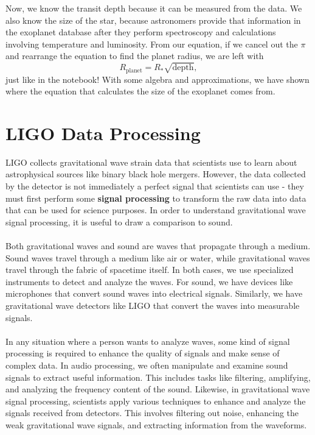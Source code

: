 \documentclass[14pt]{article}
\begin{document}
\noindent Now, we know the transit depth because it can be measured from the data. We also know the size of the star, because astronomers provide that information in the exoplanet database after they perform spectroscopy and calculations involving temperature and luminosity. From our equation, if we cancel out the $\pi$ and rearrange the equation to find the planet radius, we are left with 
\begin{equation}
    R_{\text{planet}} = R_{*} \sqrt{\text{depth}},
\end{equation}
just like in the notebook! With some algebra and approximations, we have shown where the equation that calculates the size of the exoplanet comes from.

\section{LIGO Data Processing}
\label{a:sigproc}
LIGO collects gravitational wave strain data that scientists use to learn about astrophysical sources like binary black hole mergers. However, the data collected by the detector is not immediately a perfect signal that scientists can use - they must first perform some \textbf{signal processing} to transform the raw data into data that can be used for science purposes. In order to understand gravitational wave signal processing, it is useful to draw a comparison to sound.
\\\\
\noindent Both gravitational waves and sound are waves that propagate through a medium. Sound waves travel through a medium like air or water, while gravitational waves travel through the fabric of spacetime itself. In both cases, we use specialized instruments to detect and analyze the waves. For sound, we have devices like microphones that convert sound waves into electrical signals. Similarly, we have gravitational wave detectors like LIGO that convert the waves into measurable signals.
\\\\
\noindent In any situation where a person wants to analyze waves, some kind of signal processing is required to enhance the quality of signals and make sense of complex data. In audio processing, we often manipulate and examine sound signals to extract useful information. This includes tasks like filtering, amplifying, and analyzing the frequency content of the sound. Likewise, in gravitational wave signal processing, scientists apply various techniques to enhance and analyze the signals received from detectors. This involves filtering out noise, enhancing the weak gravitational wave signals, and extracting information from the waveforms.
\end{document}
